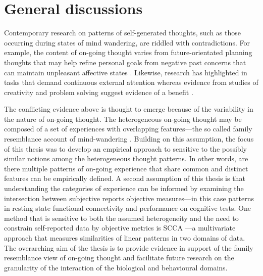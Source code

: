 \chapter{General discussions}
\label{ch:discussion}
Contemporary research on patterns of self-generated thoughts, such as those occurring during states of mind wandering, are riddled with contradictions. For example, the content of on-going thought varies from future-orientated planning thoughts that may help refine personal goals \cite{Medea2016} from negative past concerns that can maintain unpleasant affective states \cite{Killingsworth2010}. Likewise, research has highlighted in tasks that demand continuous external attention \cite{McVayJOEP2009,McVay2012} whereas evidence from studies of creativity and problem solving suggest evidence of a benefit \cite{Smeekens2016,Baird2012}. 

The conflicting evidence above is thought to emerge because of the variability in the nature of on-going thought. The heterogeneous on-going thought may be composed of a set of experiences with overlapping features---the so called family resemblance account of mind-wandering \cite{Smallwood2013, Seli2018}. Building on this assumption, the focus of this thesis was to develop an empirical approach to sensitive to the possibly similar notions among the heterogeneous thought patterns. In other words, are there multiple patterns of on-going experience that share common and distinct features can be empirically defined. 
A second assumption of this thesis is that understanding the categories of experience can be informed by examining the intersection between subjective reports objective measures---in this case patterns in resting state functional connectivity and performance on cognitive tests. One method that is sensitive to both the assumed heterogeneity and the need to constrain self-reported data by objective metrics is SCCA \cite{WittenSCCA2009}---a multivariate approach that measures similarities of linear patterns in two domains of data. The overarching aim of the thesis is to provide evidence in support of the family resemblance view of on-going thought and facilitate future research on the granularity of the interaction of the biological and behavioural domains.

